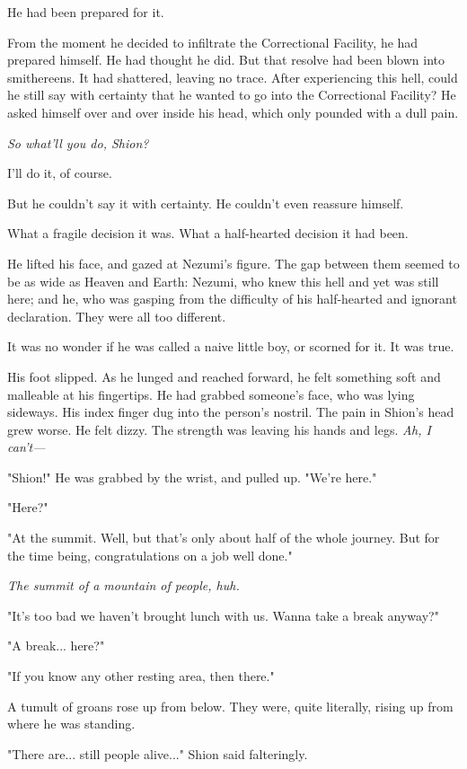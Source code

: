 He had been prepared for it.

From the moment he decided to infiltrate the Correctional Facility, he
had prepared himself. He had thought he did. But that resolve had been
blown into smithereens. It had shattered, leaving no trace. After
experiencing this hell, could he still say with certainty that he wanted
to go into the Correctional Facility? He asked himself over and over
inside his head, which only pounded with a dull pain.

\emph{So what'll you do, Shion?}

I'll do it, of course.

But he couldn't say it with certainty. He couldn't even reassure
himself.

What a fragile decision it was. What a half-hearted decision it had
been.

He lifted his face, and gazed at Nezumi's figure. The gap between them
seemed to be as wide as Heaven and Earth: Nezumi, who knew this hell and
yet was still here; and he, who was gasping from the difficulty of his
half-hearted and ignorant declaration. They were all too different.

It was no wonder if he was called a naive little boy, or scorned for it.
It was true.

His foot slipped. As he lunged and reached forward, he felt something
soft and malleable at his fingertips. He had grabbed someone's face, who
was lying sideways. His index finger dug into the person's nostril. The
pain in Shion's head grew worse. He felt dizzy. The strength was leaving
his hands and legs. \emph{Ah, I can't---}

"Shion!" He was grabbed by the wrist, and pulled up. "We're here."

"Here?"

"At the summit. Well, but that's only about half of the whole journey.
But for the time being, congratulations on a job well done."

\emph{The summit of a mountain of people, huh.}

"It's too bad we haven't brought lunch with us. Wanna take a break
anyway?"

"A break... here?"

"If you know any other resting area, then there."

A tumult of groans rose up from below. They were, quite literally,
rising up from where he was standing.

"There are... still people alive..." Shion said falteringly.

